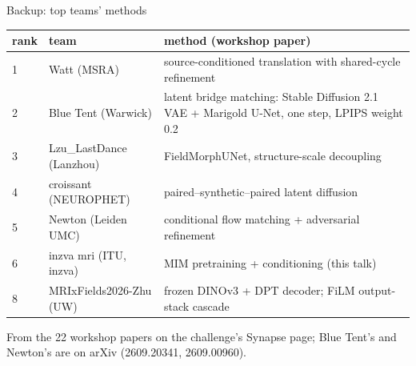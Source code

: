 \documentclass[t,aspectratio=169,11pt]{beamer}
\newcommand{\gloss}[1]{{\footnotesize\textcolor{black!65}{#1}}\par}
\begin{document}
\begin{frame}{Backup: top teams' methods}
  \footnotesize
  \begin{tabular}{@{}llp{8.4cm}@{}}
    \toprule
    rank & team & method (workshop paper) \\
    \midrule
    1 & Watt (MSRA) & source-conditioned translation with shared-cycle refinement \\
    2 & Blue Tent (Warwick) & latent bridge matching: Stable Diffusion 2.1 VAE + Marigold U-Net,
      one step, LPIPS weight 0.2 \\
    3 & Lzu\_LastDance (Lanzhou) & FieldMorphUNet, structure-scale decoupling \\
    4 & croissant (NEUROPHET) & paired--synthetic--paired latent diffusion \\
    5 & Newton (Leiden UMC) & conditional flow matching + adversarial refinement \\
    6 & inzva mri (ITU, inzva) & MIM pretraining + conditioning (this talk) \\
    8 & MRIxFields2026-Zhu (UW) & frozen DINOv3 + DPT decoder; FiLM output-stack cascade \\
    \bottomrule
  \end{tabular}

  \vspace{3mm}
  \gloss{From the 22 workshop papers on the challenge's Synapse page; Blue Tent's and Newton's
  are on arXiv (2609.20341, 2609.00960).}
\end{frame}
\end{document}
